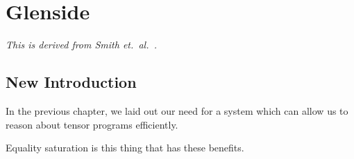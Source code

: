 





\chapter{Glenside}
\label{sec:part1-glenside}

\textit{This is derived from Smith et.~al.~\cite{smith2021pure}.}

\section{New Introduction}

In the previous chapter,
  we laid out our need
  for a system
  which can allow us
  to reason about tensor programs efficiently.

Equality saturation is this thing
  that has these benefits.

